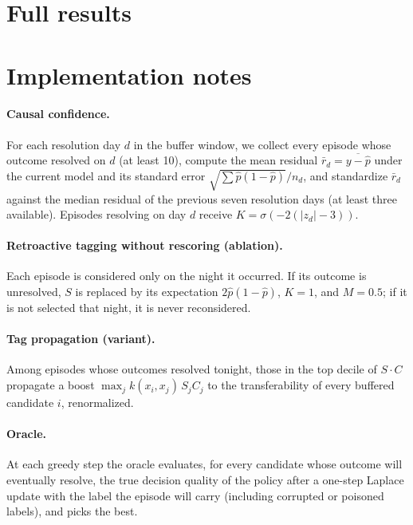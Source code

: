 \section{Full results}
\label{app:full}


\section{Implementation notes}
\label{app:impl}
\paragraph{Causal confidence.} For each resolution day $d$ in the buffer window, we collect every episode whose outcome resolved on $d$ (at least 10), compute the mean residual $\bar r_d=\overline{y-\hat p}$ under the current model and its standard error $\sqrt{\sum\hat p(1-\hat p)}/n_d$, and standardize $\bar r_d$ against the median residual of the previous seven resolution days (at least three available). Episodes resolving on day $d$ receive $K=\sigma(-2(|z_d|-3))$.

\paragraph{Retroactive tagging without rescoring (ablation).} Each episode is considered only on the night it occurred. If its outcome is unresolved, $S$ is replaced by its expectation $2\hat p(1-\hat p)$, $K=1$, and $M=0.5$; if it is not selected that night, it is never reconsidered.

\paragraph{Tag propagation (variant).} Among episodes whose outcomes resolved tonight, those in the top decile of $S\cdot C$ propagate a boost $\max_j k(x_i,x_j)\,S_jC_j$ to the transferability of every buffered candidate $i$, renormalized.

\paragraph{Oracle.} At each greedy step the oracle evaluates, for every candidate whose outcome will eventually resolve, the true decision quality of the policy after a one-step Laplace update with the label the episode will carry (including corrupted or poisoned labels), and picks the best.

